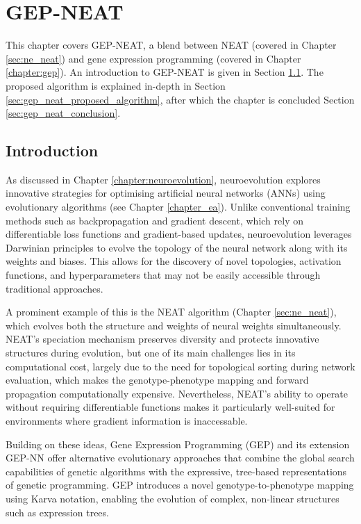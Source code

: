 \chapter{GEP-NEAT}\label{chapter:gep_neat}
This chapter covers GEP-NEAT, a blend between NEAT (covered in Chapter \ref{sec:ne_neat}) and gene expression programming (covered in Chapter \ref{chapter:gep}). An introduction to GEP-NEAT is given in Section \ref{sec:gep_neat_introduction}. The proposed algorithm is explained in-depth in Section \ref{sec:gep_neat_proposed_algorithm}, after which the chapter is concluded Section \ref{sec:gep_neat_conclusion}.

\section{Introduction}\label{sec:gep_neat_introduction}
As discussed in Chapter \ref{chapter:neuroevolution}, neuroevolution explores innovative strategies for optimising artificial neural networks (ANNs) using evolutionary algorithms (see Chapter \ref{chapter_ea}). Unlike conventional training methods such as backpropagation and gradient descent, which rely on differentiable loss functions and gradient-based updates, neuroevolution leverages Darwinian principles to evolve the topology of the neural network along with its weights and biases. This allows for the discovery of novel topologies, activation functions, and hyperparameters that may not be easily accessible through traditional approaches.

\parbreak\noindent A prominent example of this is the NEAT algorithm (Chapter \ref{sec:ne_neat}), which evolves both the structure and weights of neural weights simultaneously. NEAT's speciation mechanism preserves diversity and protects innovative structures during evolution, but one of its main challenges lies in its computational cost, largely due to the need for topological sorting during network evaluation, which makes the genotype-phenotype mapping and forward propagation computationally expensive. Nevertheless, NEAT's ability to operate without requiring differentiable functions makes it particularly well-suited for environments where gradient information is inaccessable.

\parbreak\noindent Building on these ideas, Gene Expression Programming (GEP) and its extension GEP-NN offer alternative evolutionary approaches that combine the global search capabilities of genetic algorithms with the expressive, tree-based representations of genetic programming. GEP introduces a novel genotype-to-phenotype mapping using Karva notation, enabling the evolution of complex, non-linear structures such as expression trees.

